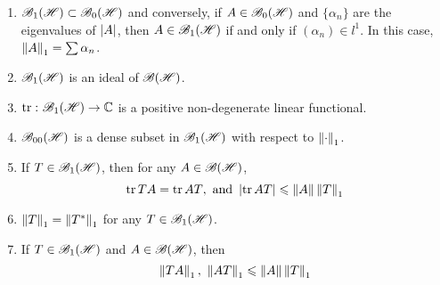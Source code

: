 \begin{thm}
	\begin{enumerate}[label=\arabic*)]
		\item $\toper \subset \coper$ and conversely, if $A \in \coper$ and $\{\alpha_n\}$ are the eigenvalues of $\abs{A}$, then $A \in \toper$ if and only if $(\alpha_n) \in l^{1}$. In this case, $\norm{A}_1 = \sum \alpha_n$.
		\item $\toper$ is an ideal of $\oper$.
		\item $\tr{} \colon \toper \sto \C$ is a positive non-degenerate linear functional.
		\item $\foper$ is a dense subset in $\toper$ with respect to $\norm{\cdot}_1$.
		\item If $T \in \toper$, then for any $A \in \oper$,
		\begin{equation*}
			\tr{TA} = \tr{AT},~\text{and } \abs{\tr{AT}} \leqslant \norm{A}\norm{T}_1
		\end{equation*}
		\item $\norm{T}_1 = \norm{\st{T}}_1$ for any $T \in \toper$.
		\item If $T \in \toper$ and $A \in \oper$, then
		\begin{equation*}
			\norm{TA}_1,~ \norm{AT}_1 \leqslant \norm{A} \norm{T}_1
		\end{equation*}
	\end{enumerate}
\end{thm}
